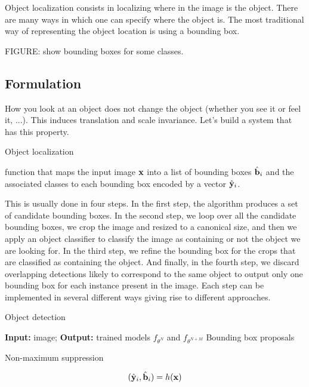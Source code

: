 Object localization consists in localizing where in the image is the object. There are many ways in which one can specify where the object is. The most traditional way of representing the object location is using a bounding box. 

FIGURE: show bounding boxes for some classes. 

\subsection{Formulation}

How you look at an object does not change the object (whether you see it or feel it, ...).  This induces translation and scale invariance. Let's build a system that has this property. 

Object localization 

function that maps the input image ${\bf x}$ into a list of bounding boxes $\hat {\bf b}_i$ and the associated classes to each bounding box encoded by a vector $\hat {\bf y}_i$.

This is usually done in four steps. In the first step, the algorithm produces a set of candidate bounding boxes. In the second step, we loop over all the candidate bounding boxes, we crop the image and resized to a canonical size, and then we apply an object classifier to classify the image as containing or not the object we are looking for. In the third step, we refine the bounding box for the crops that are classified as containing the object. And finally, in the fourth step, we discard overlapping detections likely to correspond to the same object to output only one bounding box for each instance present in the image. Each step can be implemented in several different ways giving rise to different approaches. 

\begin{algorithm}[h]
\label{object_localization}
\SetAlgoVlined
\DontPrintSemicolon
\caption{Object detection}
{\bf Input:} image;
{\bf Output:} trained models $f_{\theta^{N}}$ and $f_{\theta^{N+M}}$\;
Bounding box proposals\;


Non-maximum suppression\;
\end{algorithm}



\begin{equation}
(\hat {\bf y}_i, \hat {\bf b}_i) = h({\bf x})
\end{equation}





